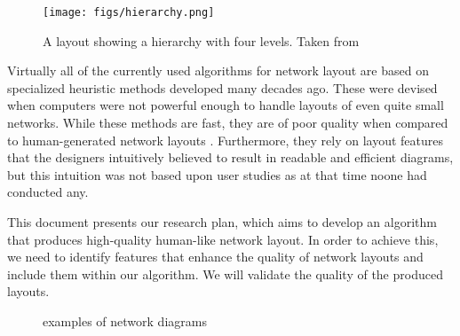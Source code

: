 \documentclass[a4paper,11pt,phdthesis,singlespace,twoside]{cssethesis}
\begin{document}
\begin{figure}[H]
\begin{center}
\texttt{[image: figs/hierarchy.png]}
\end{center}
\caption{A layout showing a hierarchy with four levels. Taken from \cite{sugiyama1981methods}}
\label{fig:hierarchy}
\end{figure}


Virtually all of the currently used algorithms for network layout are based on specialized heuristic methods developed many decades ago. These were devised when computers were not powerful enough to handle layouts of even quite small networks. 
While these methods are fast, they are of poor quality when compared to human-generated network layouts \cite{kieffer2015hola}. Furthermore, they rely on layout features that the designers intuitively believed to result in readable and efficient diagrams, but this intuition was not based upon user studies as at that time noone had conducted any.

This document presents our research plan, which aims to develop an algorithm that produces high-quality human-like network layout. In order to achieve this, we need to identify features that enhance the quality of network layouts and include them within our algorithm. We will validate the quality of the produced layouts.

\begin{figure}
\centering



\caption{examples of network diagrams}
\end{figure}
\end{document}
